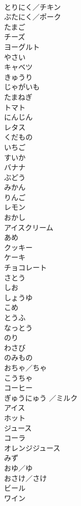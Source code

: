 \documentclass[8pt]{extreport}
\begin{document}
\begin{CJK}{UTF8}{min}
\\	とりにく／チキン	
\\	ぶたにく／ポーク	
\\	たまご	
\\	チーズ	
\\	ヨーグルト	
\\	やさい	
\\	キャベツ	
\\	きゅうり	
\\	じゃがいも	
\\	たまねぎ	
\\	トマト	
\\	にんじん	
\\	レタス	
\\	くだもの	
\\	いちご	
\\	すいか	
\\	バナナ	
\\	ぶどう	
\\	みかん	
\\	りんご	
\\	レモン	
\\	おかし	
\\	アイスクリーム	
\\	あめ	
\\	クッキー	
\\	ケーキ	
\\	チョコレート	
\\	さとう	
\\	しお	
\\	しょうゆ	
\\	こめ	
\\	とうふ	
\\	なっとう	
\\	のり	
\\	わさび	
\\	のみもの	
\\	おちゃ／ちゃ	
\\	こうちゃ	
\\	コーヒー	
\\	ぎゅうにゅう ／ミルク	
\\	アイス	
\\	ホット	
\\	ジュース	
\\	コーラ	
\\	オレンジジュース	
\\	みず	
\\	おゆ／ゆ	
\\	おさけ／さけ	
\\	ビール	
\\	ワイン	

\end{CJK}
\end{document}
